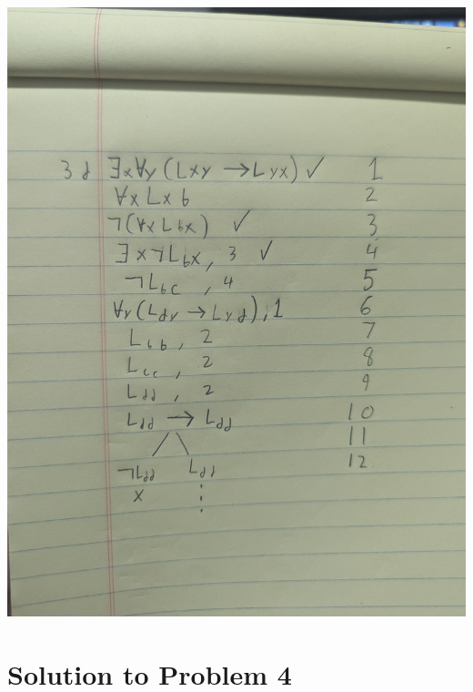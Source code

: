 \documentclass[12pt]{article}
\begin{document}
\includegraphics[width=\textwidth]{3d}

\section*{Solution to Problem 4}
\end{document}
